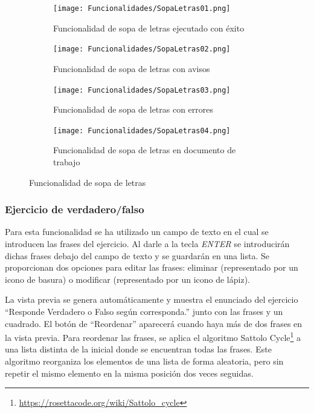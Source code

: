 \begin{figure}[ht!]
  \centering
  \begin{subfigure}{\textwidth}
    \centering
    \texttt{[image: Funcionalidades/SopaLetras01.png]}
    \caption{Funcionalidad de sopa de letras ejecutado con éxito}
    \label{fig:impsopaletras01}
  \end{subfigure}

  \begin{subfigure}{\textwidth}
    \centering
    \texttt{[image: Funcionalidades/SopaLetras02.png]}
    \caption{Funcionalidad de sopa de letras con avisos}
    \label{fig:impsopaletras02}
  \end{subfigure}

  \begin{subfigure}{\textwidth}
    \centering
    \texttt{[image: Funcionalidades/SopaLetras03.png]}
    \caption{Funcionalidad de sopa de letras con errores}
    \label{fig:impsopaletras03}
  \end{subfigure}

  \begin{subfigure}{\textwidth}
    \centering
    \texttt{[image: Funcionalidades/SopaLetras04.png]}
    \caption{Funcionalidad de sopa de letras en documento de trabajo}
    \label{fig:impsopaletras04}
  \end{subfigure}

  \caption{Funcionalidad de sopa de letras}
  \label{fig:impsopaletras}
\end{figure}

\subsubsection{Ejercicio de verdadero/falso}
\label{sec:funcioVF}
Para esta funcionalidad se ha utilizado un campo de texto en el cual se introducen las frases del ejercicio. Al darle a la tecla \textit{ENTER} se introducirán dichas frases debajo del campo de texto y se guardarán en una lista. Se proporcionan dos opciones para editar las frases: eliminar (representado por un icono de basura) o modificar (representado por un icono de lápiz).

La vista previa se genera automáticamente y muestra el enunciado del ejercicio ``Responde Verdadero o Falso según corresponda.'' junto con las frases y un cuadrado. El botón de ``Reordenar'' aparecerá cuando haya más de dos frases en la vista previa. Para reordenar las frases, se aplica el algoritmo Sattolo Cycle\footnote{\url{https://rosettacode.org/wiki/Sattolo_cycle}} a una lista distinta de la inicial donde se encuentran todas las frases. Este algoritmo reorganiza los elementos de una lista de forma aleatoria, pero sin repetir el mismo elemento en la misma posición dos veces seguidas.

